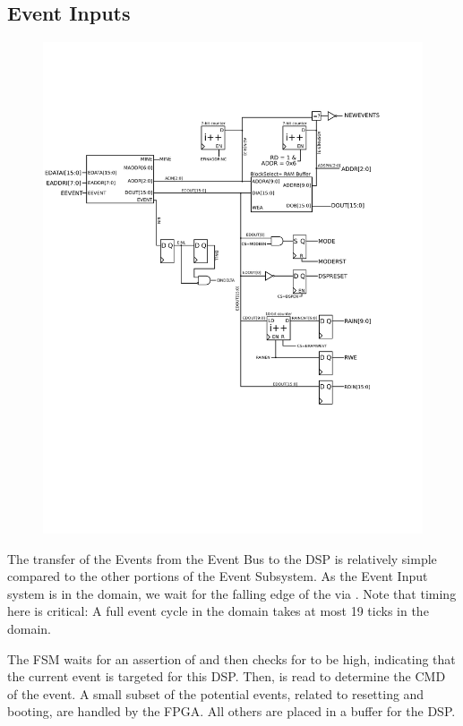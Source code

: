 \subsection{Event Inputs} 

\begin{figure}[h!]
\includegraphics[scale=0.8]{input.svg}
\end{figure}

The transfer of the Events from the Event Bus to the DSP is relatively
simple compared to the other portions of the Event Subsystem. As the
Event Input system is in the  domain, we wait
for the falling edge of the  via
. Note that timing here is critical: A full
event cycle in the  domain takes at most 19
ticks in the  domain.
      
The FSM waits for an assertion of  and then
checks for  to be high, indicating that the
current event is targeted for this DSP. Then,
 is read to determine the CMD of the event.
A small subset of the potential events, related to resetting and
booting, are handled by the FPGA. All others are placed in a buffer
for the DSP.


